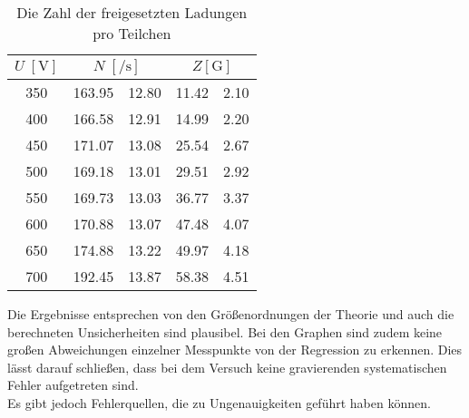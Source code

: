     \begin{table}[H]
        \centering
        \caption{Die Zahl der freigesetzten Ladungen pro Teilchen}
        \label{tab:zahlproteilchen2}
        \begin{tabular}{c c @{${}\pm{}$} c c @{${}\pm{}$} c}
            \toprule
            $U \; [\si{\volt}]$ & 
            \multicolumn{2}{c}{$N \; [\si{\per\second}]$} & 
            \multicolumn{2}{c}{$Z [\si{\giga}]$} \\
            \midrule
            350 & 163.95 & 12.80 & 11.42 & 2.10\\
            400 & 166.58 & 12.91 & 14.99 & 2.20\\
            450 & 171.07 & 13.08 & 25.54 & 2.67\\
            500 & 169.18 & 13.01 & 29.51 & 2.92\\
            550 & 169.73 & 13.03 & 36.77 & 3.37\\
            600 & 170.88 & 13.07 & 47.48 & 4.07\\
            650 & 174.88 & 13.22 & 49.97 & 4.18\\
            700 & 192.45 & 13.87 & 58.38 & 4.51\\
            \bottomrule
        \end{tabular}
    \end{table}
\newpage
\noindent Die Ergebnisse entsprechen von den Größenordnungen der Theorie und auch die berechneten Unsicherheiten
sind plausibel. Bei den Graphen sind zudem keine großen Abweichungen einzelner Messpunkte von der 
Regression zu erkennen. Dies lässt darauf schließen, dass bei dem Versuch keine gravierenden systematischen
Fehler aufgetreten sind.
\\
Es gibt jedoch Fehlerquellen, die zu Ungenauigkeiten geführt haben können. 
